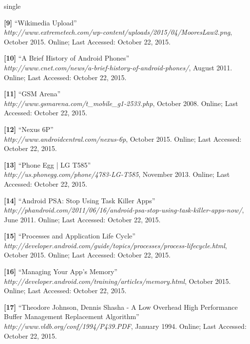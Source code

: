 \documentclass[12pt]{uthesis-v12}  %
\begin{document}
\begin{referencelist}{single}
	\item \textbf{[9]} ``Wikimedia Upload''
	\\\emph{http://www.extremetech.com/wp-content/uploads/2015/04/MooresLaw2.png}, October 2015. 
	Online; Last Accessed: October 22, 2015.
	
	\item \textbf{[10]} ``A Brief History of Android Phones''
	\\\emph{http://www.cnet.com/news/a-brief-history-of-android-phones/}, August 2011. 
	Online; Last Accessed: October 22, 2015.
	
	\item \textbf{[11]} ``GSM Arena''
	\\\emph{http://www.gsmarena.com/t\_mobile\_g1-2533.php}, October 2008. 
	Online; Last Accessed: October 22, 2015.
	
	\item \textbf{[12]} ``Nexus 6P''
	\\\emph{http://www.androidcentral.com/nexus-6p}, October 2015. 
	Online; Last Accessed: October 22, 2015.
	
	\item \textbf{[13]} ``Phone Egg | LG T585''
	\\\emph{http://us.phonegg.com/phone/4783-LG-T585}, November 2013. 
	Online; Last Accessed: October 22, 2015.		
	
	\item \textbf{[14]} ``Android PSA: Stop Using Task Killer Apps''
	\\\emph{http://phandroid.com/2011/06/16/android-psa-stop-using-task-killer-apps-now/}, June 2011. 
	Online; Last Accessed: October 22, 2015.
	
	\item \textbf{[15]} ``Processes and Application Life Cycle''
	\\\emph{http://developer.android.com/guide/topics/processes/process-lifecycle.html}, October 2015. 
	Online; Last Accessed: October 22, 2015.
	
	\item \textbf{[16]} ``Managing Your App's Memory''
	\\\emph{http://developer.android.com/training/articles/memory.html}, October 2015. 
	Online; Last Accessed: October 22, 2015.	
	
	\item \textbf{[17]} ``Theodore Johnson, Dennis Shasha - A Low Overhead High Performance Buffer Management Replacement Algorithm''
	\\\emph{http://www.vldb.org/conf/1994/P439.PDF}, January 1994. 
	Online; Last Accessed: October 22, 2015.	
		

\end{referencelist}
\end{document}
